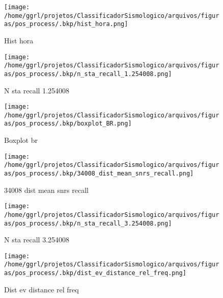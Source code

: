                     \begin{figure}[H]
                        \centering
                        \texttt{[image: /home/ggrl/projetos/ClassificadorSismologico/arquivos/figuras/pos\_process/.bkp/hist\_hora.png]}
                        \caption{Hist hora}
                        \label{fig:hist_hora}
                    \end{figure}
                

                    \begin{figure}[H]
                        \centering
                        \texttt{[image: /home/ggrl/projetos/ClassificadorSismologico/arquivos/figuras/pos\_process/.bkp/n\_sta\_recall\_1.254008.png]}
                        \caption{N sta recall 1.254008}
                        \label{fig:n_sta_recall_1.254008}
                    \end{figure}
                

                    \begin{figure}[H]
                        \centering
                        \texttt{[image: /home/ggrl/projetos/ClassificadorSismologico/arquivos/figuras/pos\_process/.bkp/boxplot\_BR.png]}
                        \caption{Boxplot br}
                        \label{fig:boxplot_BR}
                    \end{figure}
                

                    \begin{figure}[H]
                        \centering
                        \texttt{[image: /home/ggrl/projetos/ClassificadorSismologico/arquivos/figuras/pos\_process/.bkp/34008\_dist\_mean\_snrs\_recall.png]}
                        \caption{34008 dist mean snrs recall}
                        \label{fig:34008_dist_mean_snrs_recall}
                    \end{figure}
                

                    \begin{figure}[H]
                        \centering
                        \texttt{[image: /home/ggrl/projetos/ClassificadorSismologico/arquivos/figuras/pos\_process/.bkp/n\_sta\_recall\_3.254008.png]}
                        \caption{N sta recall 3.254008}
                        \label{fig:n_sta_recall_3.254008}
                    \end{figure}
                

                    \begin{figure}[H]
                        \centering
                        \texttt{[image: /home/ggrl/projetos/ClassificadorSismologico/arquivos/figuras/pos\_process/.bkp/dist\_ev\_distance\_rel\_freq.png]}
                        \caption{Dist ev distance rel freq}
                        \label{fig:dist_ev_distance_rel_freq}
                    \end{figure}
                

